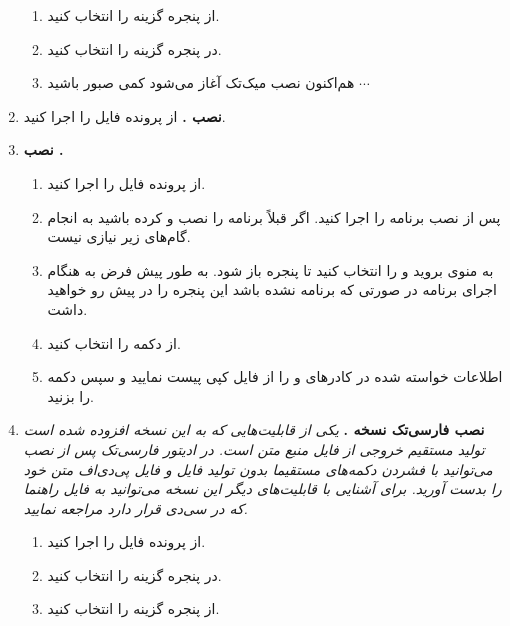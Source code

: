 \documentclass[a4paper]{article}
\begin{document}
\begin{enumerate}
\begin{enumerate}
			\item 
		از پنجره  گزینه  را انتخاب کنید.
			\item 
		در پنجره  گزینه  را انتخاب کنید.
			\item
		هم‌اکنون نصب میک‌تک آغاز می‌شود کمی صبور باشید $\cdots$ 
		\end{enumerate}
	\item 
	\textbf{نصب .} از پرونده  فایل  را اجرا کنید.
	\item 
	\textbf{نصب .}
		\begin{enumerate}
			\item 
		از پرونده  فایل  را اجرا کنید.
			\item 
		پس از نصب برنامه را اجرا کنید. اگر قبلاً برنامه را نصب و  کرده باشید به انجام گام‌های زیر نیازی نیست.
			\item 
		به منوی  بروید و  را انتخاب کنید تا پنجره  باز شود. به طور پیش فرض به هنگام اجرای برنامه در صورتی که برنامه   نشده باشد این پنجره را در پیش رو خواهید داشت.
			\item 
		از	دکمه  را انتخاب کنید.
			\item 
		اطلاعات خواسته شده در کادرهای  و  را از فایل  کپی پیست نمایید و سپس دکمه  را بزنید.
		\end{enumerate}
	\item 
	\textbf{نصب فارسی‌تک نسخه .}
\textit{یکی از قابلیت‌هایی که به این نسخه افزوده شده است تولید مستقیم خروجی  از فایل منبع متن است. در ادیتور فارسی‌تک پس از نصب می‌توانید با فشردن دکمه‌های  مستقیما بدون تولید فایل  و  فایل پی‌دی‌اف متن خود را بدست آورید.
برای آشنایی با قابلیت‌های دیگر این نسخه می‌توانید به فایل راهنما که در سی‌دی قرار دارد مراجعه نمایید.}
		\begin{enumerate}
			\item 
			از پرونده  فایل   را اجرا کنید.
			\item 
			در پنجره  گزینه  را انتخاب کنید.
			\item 
			از پنجره  گزینه  را انتخاب کنید.

\end{enumerate}
\end{enumerate}
\end{document}
